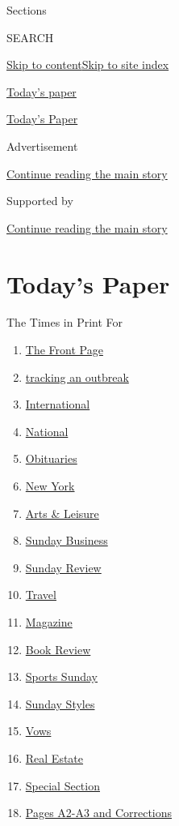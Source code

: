 Sections

SEARCH

\protect\hyperlink{site-content}{Skip to
content}\protect\hyperlink{site-index}{Skip to site index}

\href{https://www.nytimes3xbfgragh.onion/section/todayspaper}{Today's
paper}

\href{https://myaccount.nytimes3xbfgragh.onion/auth/login?response_type=cookie\&client_id=vi}{}

\href{https://www.nytimes3xbfgragh.onion/section/todayspaper}{Today's
Paper}

Advertisement

\protect\hyperlink{after-top}{Continue reading the main story}

Supported by

\protect\hyperlink{after-sponsor}{Continue reading the main story}

\hypertarget{todays-paper}{%
\section{Today's Paper}\label{todays-paper}}

The Times in Print For

\begin{enumerate}
\def\labelenumi{\arabic{enumi}.}
\tightlist
\item
  \protect\hyperlink{thefrontpage}{The Front Page}
\item
  \protect\hyperlink{trackinganoutbreak}{tracking an outbreak}
\item
  \protect\hyperlink{international}{International}
\item
  \protect\hyperlink{national}{National}
\item
  \protect\hyperlink{obituaries}{Obituaries}
\item
  \protect\hyperlink{newyork}{New York}
\item
  \protect\hyperlink{artsux5cux26leisure}{Arts \& Leisure}
\item
  \protect\hyperlink{sundaybusiness}{Sunday Business}
\item
  \protect\hyperlink{sundayreview}{Sunday Review}
\item
  \protect\hyperlink{travel}{Travel}
\item
  \protect\hyperlink{magazine}{Magazine}
\item
  \protect\hyperlink{bookreview}{Book Review}
\item
  \protect\hyperlink{sportssunday}{Sports Sunday}
\item
  \protect\hyperlink{sundaystyles}{Sunday Styles}
\item
  \protect\hyperlink{vows}{Vows}
\item
  \protect\hyperlink{realestate}{Real Estate}
\item
  \protect\hyperlink{specialsection}{Special Section}
\item
  \protect\hyperlink{pagesa2-a3andcorrections}{Pages A2-A3 and
  Corrections}
\end{enumerate}

